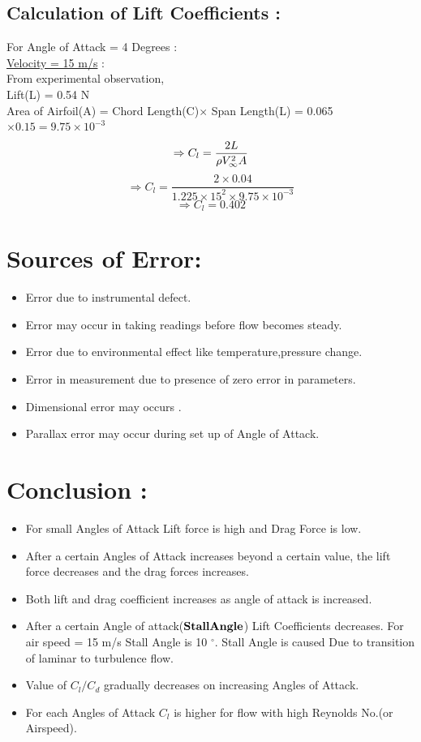 \documentclass[12pt,a4paper]{article}
\begin{document}
\subsection{Calculation of Lift Coefficients :}
For Angle of Attack = 4 Degrees : \\
\underline{Velocity = 15 m/s} :\\
From experimental observation, \\
Lift(L) = 0.54 N\\
Area of Airfoil(A) = Chord Length(C)$\times$ Span Length(L) = 0.065$\times0.15 = 9.75 \times 10^{-3}$  \\
$$\Rightarrow C_l = \frac{2L}{\rho V_{\infty}^2 A}\\$$
$$\Rightarrow C_l = \frac{2\times 0.04}{1.225 \times 15^2 \times 9.75 \times 10^{-3}} $$
$$\Rightarrow \boxed{C_l = 0.402} $$


\section{Sources of Error:}
\begin{itemize}
    \item Error due to instrumental defect.
    \item Error may occur in taking readings before flow becomes steady.
    \item Error due to environmental effect like temperature,pressure change.
    \item Error in measurement due to presence of zero error in parameters.
    \item Dimensional error may occurs .
    \item Parallax error may occur during set up of Angle of Attack.
\end{itemize}



\section{Conclusion :}
\begin{itemize}
    \item For small Angles of Attack Lift force is high and Drag Force is low.
    \item After a certain Angles of Attack  increases beyond a  
certain value, the lift force decreases and the drag forces increases.
    \item Both  lift and  drag coefficient  increases as  angle of attack  is 
increased. 
    \item After a certain Angle of attack($\bold{Stall Angle}$) Lift Coefficients decreases. For air speed = 15 m/s Stall Angle is 10 $^{\circ}$. Stall Angle is caused Due to transition of laminar to turbulence flow.
    \item Value of $C_l/C_d$ gradually decreases on increasing Angles of Attack.
    \item For each Angles of Attack $C_l$ is higher for flow with high Reynolds No.(or Airspeed).
\end{itemize}
\end{document}
